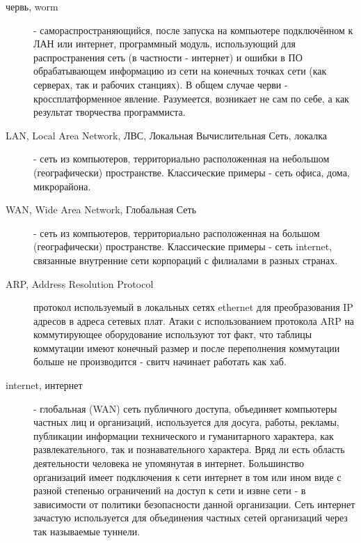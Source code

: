 \begin{description}
\item[червь, worm]
 - самораспространяющийся, после запуска на компьютере подключённом
к ЛАН или интернет, программный модуль, использующий для распространения сеть
(в частности - интернет) и ошибки в ПО обрабатывающем информацию из сети на
конечных точках сети (как серверах, так и рабочих станциях). В общем случае
черви - кроссплатформенное явление. Разумеется, возникает не сам по себе, а как
результат творчества программиста.

\item[LAN, Local Area Network, ЛВС, Локальная Вычислительная Сеть, локалка ]
 - сеть
из компьютеров, территориально расположенная на небольшом (географически) пространстве.
Классические примеры - сеть офиса, дома, микрорайона.

\item[WAN, Wide Area Network, Глобальная Сеть ]
 -  сеть
из компьютеров, территориально расположенная на большом (географически) пространстве.
Классические примеры - сеть internet, связанные внутренние сети корпораций с филиалами
в разных странах.

\item [ ARP, Address Resolution Protocol ]
протокол используемый в локальных сетях ethernet для преобразования IP адресов в адреса
сетевых плат. Атаки с использованием протокола ARP на коммутирующее оборудование
используют тот факт, что таблицы коммутации имеют конечный размер и после переполнения
коммутации больше не производится - свитч начинает работать как хаб.

\item [ internet, интернет ]
 - глобальная (WAN) сеть публичного доступа, объединяет
компьютеры частных лиц и организаций, используется для досуга, работы, рекламы, публикации
информации технического и гуманитарного характера, как развлекательного, так и познавательного
характера. Вряд ли есть область деятельности человека не упомянутая в интернет. Большинство
организаций имеет подключения к сети интернет в том или ином виде с разной степенью
ограничений на доступ к сети и извне сети - в зависимости от политики безопасности
данной организации. Сеть интернет зачастую используется для объединения частных сетей организаций
через так называемые туннели.


\end{description}
